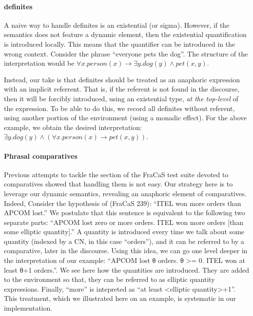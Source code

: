 \documentclass[11pt]{article}
\begin{document}
\paragraph{definites} A naive way to handle definites is an
existential (or sigma). However, if the semantics does not feature a
dynamic element, then the existential quantification is introduced
locally. This means that the quantifier can be introduced in the wrong
context. Consider the phrase ``everyone pets the dog''. The structure
of the interpretation would be
$∀x. person(x) → ∃y. dog(y) ∧ pet(x,y)$.

Instead, our take is that definites should be treated as an anaphoric
expression with an implicit referrent. That is, if the referent is not
found in the discourse, then it will be forcibly introduced, using an
existential type, \emph{at the top-level} of the expression. To be
able to do this, we record all definites without referent, using
another portion of the environment (using a monadic effect). For the
above example, we obtain the desired interpretation:
$∃y. dog(y) ∧ (∀x. person(x) → pet(x,y))$.

\paragraph{Phrasal comparatives}
Previous attempts to tackle the section of the FraCaS test suite
devoted to comparatives showed that handling them is not easy. Our
strategy here is to leverage our dynamic semantics, revealing an
anaphoric element of comparatives. Indeed, Consider the hypothesis of
(FraCaS 239): ``ITEL won more orders than APCOM lost.''  We postulate
that this sentence is equivalent to the following two separate parts:
``APCOM lost zero or more orders. ITEL won more orders [than some
elliptic quantity].''  A quantity is introduced every time we talk
about some quantity (indexed by a CN, in this case ``orders''), and it
can be referred to by a comparative, later in the discourse. Using
this idea, we can go one level deeper in the interpretation of our
example: ``APCOM lost θ orders. θ >= 0.  ITEL won at least θ+1
orders.''. We see here how the quantities are introduced. They are
added to the environment so that, they can be referred to as elliptic
quantity expressions. Finally, ``more'' is intepreted as ``at least
<elliptic quantity>+1''. This treatment, which we illustrated here on
an example, is systematic in our implementation.
\end{document}
